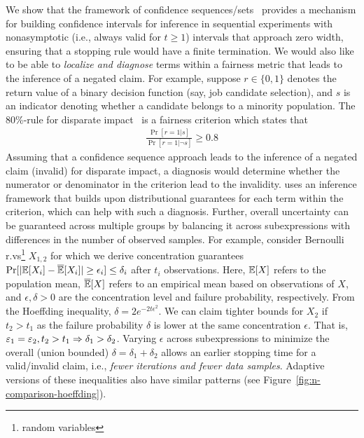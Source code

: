 We show that the framework of confidence sequences/sets~\cite{howard2021time} provides a mechanism for building confidence intervals for inference in sequential experiments with nonasymptotic (i.e., always valid for $t \geq 1$) intervals that approach zero width, ensuring that a stopping rule would have a finite termination.
We would also like to be able to \textit{localize and diagnose} terms within a fairness metric that leads to the inference of a negated claim.
For example, suppose $r \in \{ 0, 1\}$ denotes the return value of a binary decision function (say, job candidate selection), and $s$ is an indicator denoting whether a candidate belongs to a minority population.
The 80\%-rule for disparate impact~\citep{eeoc1979,feldman2015certifying} is a fairness criterion which states that
\begin{align*}
    \frac{\Pr[r=1| s]}{\Pr[r=1| \neg s]} \geq 0.8 
\end{align*}
Assuming that a confidence sequence approach leads to the inference of a negated claim (invalid) for disparate impact, a diagnosis would determine whether the numerator or denominator in the criterion lead to the invalidity.
\AVOIRmethodname{} uses an inference framework that builds upon distributional guarantees for each term within the criterion, which can help with such a diagnosis.
Further, overall uncertainty can be guaranteed across multiple groups by balancing it across subexpressions with differences in the number of observed samples.
For example, consider Bernoulli r.vs\footnote{random variables} $X_{1,2}$ for which we derive concentration guarantees $\Pr[|\mathbb{E}[X_i] - \overline{\mathbb{E}}[X_i]| \geq \epsilon_{i}] \leq \delta_{i}$ after $t_{i}$ observations. 
Here, $\mathbb{E}[X]$ refers to the population mean, $\overline{\mathbb{E}}[X]$ refers to an empirical mean based on observations of $X$, and $\epsilon, \delta > 0$ are the concentration level and failure probability, respectively.
From the Hoeffding inequality, $\delta = 2e^{-2t\epsilon^2}$.
We can claim tighter bounds for $X_2$ if $t_2 > t_1$ as the failure probability $\delta$ is lower at the same concentration $\epsilon$.
That is, $\varepsilon_1 = \varepsilon_2, t_2 > t_1 \Rightarrow \delta_1 > \delta_2$.
Varying $\epsilon$ across subexpressions to minimize the overall (union bounded) $\delta = \delta_1 + \delta_2$ allows an earlier stopping time for a valid/invalid claim, i.e., \textit{fewer iterations and fewer data samples}.
Adaptive versions of these inequalities also have similar patterns (see Figure~\ref{fig:n-comparison-hoeffding}).

